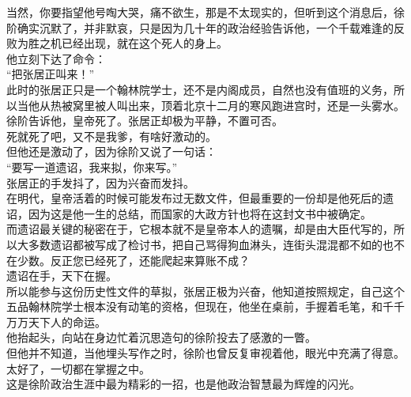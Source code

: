 \begin{multicols}{\theparacolNo}
当然，你要指望他号啕大哭，痛不欲生，那是不太现实的，但听到这个消息后，徐阶确实沉默了，并非默哀，只是因为几十年的政治经验告诉他，一个千载难逢的反败为胜之机已经出现，就在这个死人的身上。\\

他立刻下达了命令：\\

“把张居正叫来！”\\

此时的张居正只是一个翰林院学士，还不是内阁成员，自然也没有值班的义务，所以当他从热被窝里被人叫出来，顶着北京十二月的寒风跑进宫时，还是一头雾水。\\

徐阶告诉他，皇帝死了。张居正却极为平静，不置可否。\\

死就死了吧，又不是我爹，有啥好激动的。\\

但他还是激动了，因为徐阶又说了一句话：\\

“要写一道遗诏，我来拟，你来写。”\\

张居正的手发抖了，因为兴奋而发抖。\\

在明代，皇帝活着的时候可能发布过无数文件，但最重要的一份却是他死后的遗诏，因为这是他一生的总结，而国家的大政方针也将在这封文书中被确定。\\

而遗诏最关键的秘密在于，它根本就不是皇帝本人的遗嘱，却是由大臣代写的，所以大多数遗诏都被写成了检讨书，把自己骂得狗血淋头，连街头混混都不如的也不在少数。反正您已经死了，还能爬起来算账不成？\\

遗诏在手，天下在握。\\

所以能参与这份历史性文件的草拟，张居正极为兴奋，他知道按照规定，自己这个五品翰林院学士根本没有动笔的资格，但现在，他坐在桌前，手握着毛笔，和千千万万天下人的命运。\\

他抬起头，向站在身边忙着沉思造句的徐阶投去了感激的一瞥。\\

但他并不知道，当他埋头写作之时，徐阶也曾反复审视着他，眼光中充满了得意。\\

太好了，一切都在掌握之中。\\

这是徐阶政治生涯中最为精彩的一招，也是他政治智慧最为辉煌的闪光。\\


\end{multicols}

